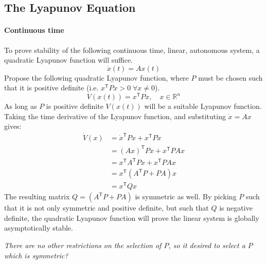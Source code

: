 \subsection{The Lyapunov Equation}

\paragraph{Continuous time} To prove stability of the following continuous time, linear, autonomous system, a quadratic Lyapunov function will suffice.
\begin{equation*}
  \dot{x}(t)=Ax(t)
\end{equation*}
Propose the following quadratic Lyapunov function, where $P$ must be chosen such that it is positive definite (i.e.
$x^{\mathsf{T}}Px>0\;\forall x\neq0$).
\begin{equation*}
  V(x(t))=x^{\mathsf{T}}Px, \quad x\in \mathbb{R}^{n}
\end{equation*}
As long as $P$ is positive definite $V(x(t))$ will be a suitable Lyapunov function.
Taking the time derivative of the Lyapunov function, and substituting $\dot{x}=Ax$ gives:
\begin{equation*}
  \begin{split}
    \dot{V}(x)&=\dot{x}^{\mathsf{T}}Px+x^{\mathsf{T}}P\dot{x} \\
    &=(Ax)^{\mathsf{T}}Px+x^{\mathsf{T}}PAx \\
    &=x^{\mathsf{T}}A^{\mathsf{T}}Px+x^{\mathsf{T}}PAx \\
    &=x^{\mathsf{T}}(A^{\mathsf{T}}P+PA)x \\
    &=x^{\mathsf{T}}Qx
  \end{split}
\end{equation*}
 The resulting matrix $Q=(A^{\mathsf{T}}P+PA)$ is symmetric as well.
By picking $P$ such that it is not only symmetric and positive definite, but such that $Q$ is negative definite, the quadratic Lyapunov function will prove the linear system is globally asymptotically stable.

\textit{There are no other restrictions on the selection of $P$, so it desired to select a $P$ which is symmetric?}

